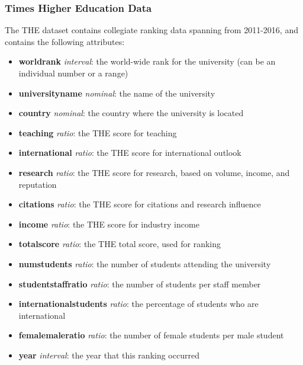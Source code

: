 \documentclass[12pt]{article}
\begin{document}
\subsubsection{Times Higher Education Data}
The THE dataset contains collegiate ranking data spanning from 2011-2016, and contains the following attributes:
\begin{itemize}
\item \textbf{world\textunderscore rank} \textit{interval}: the world-wide rank for the university (can be an individual number or a range)
\item \textbf{university\textunderscore name} \textit{nominal}: the name of the university
\item \textbf{country} \textit{nominal}: the country where the university is located
\item \textbf{teaching} \textit{ratio}: the THE score for teaching
\item \textbf{international} \textit{ratio}: the THE score for international outlook
\item \textbf{research} \textit{ratio}: the THE score for research, based on volume, income, and reputation
\item \textbf{citations} \textit{ratio}: the THE score for citations and research influence
\item \textbf{income} \textit{ratio}: the THE score for industry income
\item \textbf{total\textunderscore score} \textit{ratio}: the THE total score, used for ranking
\item \textbf{num\textunderscore students} \textit{ratio}: the number of students attending the university
\item \textbf{student\textunderscore staff\textunderscore ratio} \textit{ratio}: the number of students per staff member
\item \textbf{international\textunderscore students} \textit{ratio}: the percentage of students who are international
\item \textbf{female\textunderscore male\textunderscore ratio} \textit{ratio}: the number of female students per male student
\item \textbf{year} \textit{interval}: the year that this ranking occurred
\end{itemize}
\end{document}

